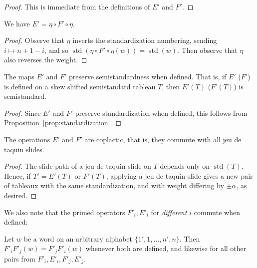 \documentclass[ALCO,ThmDefs,Unicode,epreuves]{cedram}
\DeclareMathOperator{\std}{std}
\begin{document}
\begin{proof}
This is immediate from the definitions of $E'$ and $F'$.
\end{proof}

\begin{prop} \label{prop:primed-eta}
We have $E' = \eta \circ F' \circ \eta$.
\end{prop}

\begin{proof}
Observe that $\eta$ inverts the standardization numbering, sending $i \mapsto n+1-i$, and so $\std (\eta \circ F' \circ \eta(w)) = \std (w)$. Then observe that $\eta$ also reverses the weight.
\end{proof}

\begin{prop} \label{prop:primed-semistandard}
The maps $E'$ and $F'$ preserve semistandardness when defined. That is, if $E'$ \textup{(}\resp $F'$\textup{)} is defined on a skew shifted semistandard tableau $T$, then $E'(T)$ \textup{(}\resp $F'(T)$\textup{)} is semistandard.
\end{prop}


\begin{proof}
Since $E'$ and $F'$ preserve standardization when defined, this follows from Proposition~\ref{prop:standardization}. 
\end{proof}

\begin{prop} \label{prop:primed-coplactic}
The operations $E'$ and $F'$ are coplactic, that is, they commute with all jeu de taquin slides.
\end{prop}

\begin{proof}
The slide path of a jeu de taquin slide on $T$ depends only on $\std (T)$. Hence, if $T' = E'(T)$ or $F'(T)$, applying a jeu de taquin slide gives a new pair of tableaux with the same standardization, and with weight differing by $\pm \alpha$, as desired.
\end{proof}

We also note that the primed operators $F'_i, E'_i$ for \emph{different} $i$ commute when defined:

\begin{prop} \label{prop:primed-operators-commute}
Let $w$ be a word on an arbitrary alphabet $\{1', 1, \ldots, n', n\}$. Then $F'_i F'_j(w) = F'_j F'_i(w)$ whenever both are defined, and likewise for all other pairs from $F'_i, E'_i, F'_j, E'_j$.
\end{prop}
\end{document}
